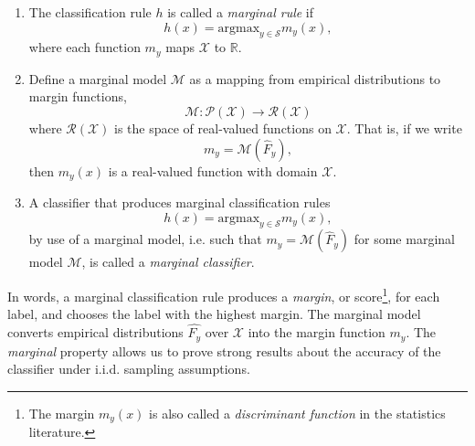 \documentclass[12pt]{article}
\begin{document}
\begin{definition}
\begin{enumerate}
\item The classification rule $h$ is called a \emph{marginal rule} if 
\[
h(x) = \text{argmax}_{y \in \mathcal{S}} m_y(x),
\]
where each function $m_y$ maps $\mathcal{X}$ to $\mathbb{R}$. 
\item Define a marginal model $\mathcal{M}$ as a mapping from empirical distributions
to margin functions,
\[
\mathcal{M}: \mathcal{P}(\mathcal{X}) \to \mathcal{R}(\mathcal{X})
\]
where $\mathcal{R}(\mathcal{X})$ is the space of real-valued functions on $\mathcal{X}$.
That is, if we write
\[
m_y = \mathcal{M}(\hat{F}_y),
\]
then $m_y(x)$ is a real-valued function with domain $\mathcal{X}$.
\item A classifier that produces marginal classification rules
\[
h(x) = \text{argmax}_{y \in \mathcal{S}} m_y(x),
\]
by use of a marginal model, i.e. such that
$m_y=\mathcal{M}(\hat{F}_y)$ for some marginal model $\mathcal{M}$,
is called a \emph{marginal classifier}.
\end{enumerate}
\end{definition}
In words, a marginal classification rule produces a \emph{margin}, or
score\footnote{The margin $m_y(x)$ is also called a \emph{discriminant
    function} in the statistics literature.}, for each label, and
chooses the label with the highest margin. The marginal model converts
empirical distributions $\hat{F_y}$ over $\mathcal{X}$ into the margin
function $m_y$.  The \emph{marginal} property allows us to prove
strong results about the accuracy of the classifier under
i.i.d. sampling assumptions.
\end{document}

